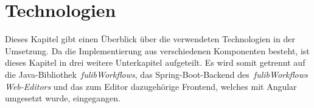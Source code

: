 \section{Technologien}\label{sec:technologien}
Dieses Kapitel gibt einen Überblick über die verwendeten Technologien in der Umsetzung.
Da die Implementierung aus verschiedenen Komponenten besteht, ist dieses Kapitel in drei weitere Unterkapitel aufgeteilt.
Es wird somit getrennt auf die Java-Bibliothek~\textit{fulibWorkflows}, das Spring-Boot-Backend des~\textit{fulibWorkflows Web-Editors}
und das zum Editor dazugehörige Frontend, welches mit Angular umgesetzt wurde, eingegangen.









